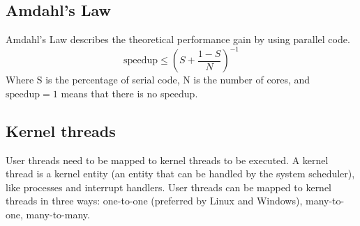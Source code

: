 \subsection{Amdahl's Law}
Amdahl's Law describes the theoretical performance gain by using parallel code.
$$ \text{speedup} \le \left (S+\frac{1-S}{N} \right )^{-1} $$
Where S is the percentage of serial code, N is the number of cores, and $ \text{speedup} = 1 $ means that there is no speedup.

\subsection{Kernel threads}
User threads need to be mapped to kernel threads to be executed. A kernel thread is a kernel entity (an entity that can be handled by the system scheduler), like processes and interrupt handlers. User threads can be mapped to kernel threads in three ways: one-to-one (preferred by Linux and Windows), many-to-one, many-to-many.